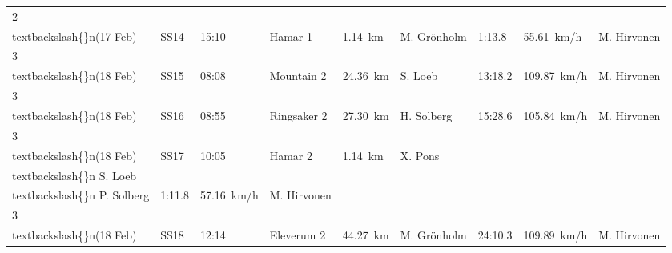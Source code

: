 \documentclass{article}
\begin{document}
\begin{tabular}{lllllllll}
2\\textbackslash\{\}n(17 Feb) & SS14 & 15:10 & Hamar 1 & 1.14 km & M. Grönholm & 1:13.8 & 55.61 km/h & M. Hirvonen \\
3\\textbackslash\{\}n(18 Feb) & SS15 & 08:08 & Mountain 2 & 24.36 km & S. Loeb & 13:18.2 & 109.87 km/h & M. Hirvonen \\
3\\textbackslash\{\}n(18 Feb) & SS16 & 08:55 & Ringsaker 2 & 27.30 km & H. Solberg & 15:28.6 & 105.84 km/h & M. Hirvonen \\
3\\textbackslash\{\}n(18 Feb) & SS17 & 10:05 & Hamar 2 & 1.14 km & X. Pons\\textbackslash\{\}n S. Loeb\\textbackslash\{\}n P. Solberg & 1:11.8 & 57.16 km/h & M. Hirvonen \\
3\\textbackslash\{\}n(18 Feb) & SS18 & 12:14 & Eleverum 2 & 44.27 km & M. Grönholm & 24:10.3 & 109.89 km/h & M. Hirvonen \\
\bottomrule
\end{tabular}
\end{document}
